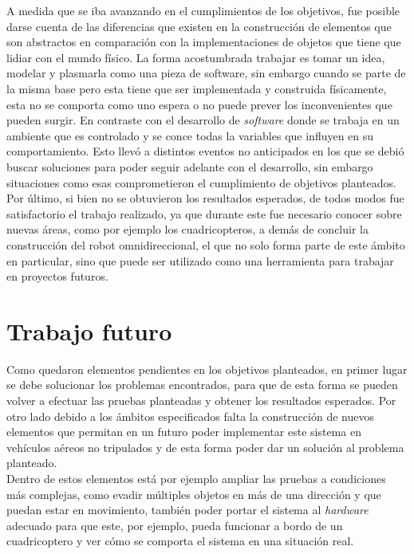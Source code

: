 \documentclass{iccmemoria}
\begin{document}
A medida que se iba avanzando en el cumplimientos de los objetivos, fue posible darse cuenta de las diferencias que existen en la construcción de elementos que son abstractos en comparación con la implementaciones de objetos que tiene que lidiar con el mundo físico. La forma acostumbrada trabajar es tomar un idea, modelar y plasmarla como una pieza de software, sin embargo cuando se parte de la misma base pero esta tiene que ser implementada y construida físicamente, esta no se comporta como uno espera o no puede prever los inconvenientes que pueden surgir. En contraste con el desarrollo de \emph{software} donde se trabaja en un ambiente que es controlado y se conce todas la variables que influyen en su comportamiento. Esto llevó a distintos eventos no anticipados en los que se debió buscar soluciones para poder seguir adelante con el desarrollo, sin embargo situaciones como esas comprometieron el cumplimiento de objetivos planteados.\\

Por último, si bien no se obtuvieron los resultados esperados, de todos modos fue satisfactorio el trabajo realizado, ya que durante este fue necesario conocer sobre nuevas áreas, como por ejemplo los cuadricopteros, a demás de concluir la construcción del robot omnidireccional, el que no solo forma parte de este ámbito en particular, sino que puede ser utilizado como una herramienta para trabajar en proyectos futuros.\\

\section{Trabajo futuro}

Como quedaron elementos pendientes en los objetivos planteados, en primer lugar se debe solucionar los problemas encontrados, para que de esta forma se pueden volver a efectuar las pruebas planteadas y obtener los resultados esperados. Por otro lado debido a los ámbitos especificados falta la construcción de nuevos elementos que permitan en un futuro poder implementar este sistema en vehículos aéreos no tripulados y de esta forma poder dar un solución al problema planteado.\\

Dentro de estos elementos está por ejemplo ampliar las pruebas a condiciones más complejas, como evadir múltiples objetos en más de una dirección y que puedan estar en movimiento, también poder portar el sistema al \emph{hardware} adecuado para que este, por ejemplo, pueda funcionar a bordo de un cuadricoptero y ver cómo se comporta el sistema en una situación real.\\
\end{document}
